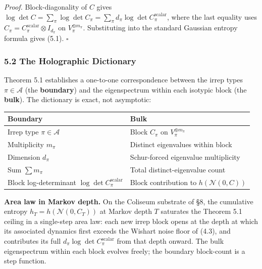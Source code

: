 \documentclass[
  11pt,
]{article}
\newcounter{none} %
\begin{document}
\emph{Proof.} Block-diagonality of \(C\) gives
\(\log\det C = \sum_\pi \log\det C_\pi = \sum_\pi d_\pi \log\det C_\pi^\text{scalar}\),
where the last equality uses
\(C_\pi = C_\pi^\text{scalar} \otimes I_{d_\pi}\) on
\(V_\pi^{\oplus m_\pi}\). Substituting into the standard Gaussian
entropy formula gives (5.1). \(\square\)

\subsubsection{5.2 The Holographic
Dictionary}\label{the-holographic-dictionary}

Theorem 5.1 establishes a one-to-one correspondence between the irrep
types \(\pi \in \mathcal{A}\) (the \textbf{boundary}) and the
eigenspectrum within each isotypic block (the \textbf{bulk}). The
dictionary is exact, not asymptotic:

{\def\LTcaptype{none} %
\begin{longtable}[]{@{}
  >{\raggedright\arraybackslash}p{}
  >{\raggedright\arraybackslash}p{}@{}}
\toprule\noalign{}
\begin{minipage}[b]{\linewidth}\raggedright
Boundary
\end{minipage} & \begin{minipage}[b]{\linewidth}\raggedright
Bulk
\end{minipage} \\
\midrule\noalign{}
\endhead
\bottomrule\noalign{}
\endlastfoot
Irrep type \(\pi \in \mathcal{A}\) & Block \(C_\pi\) on
\(V_\pi^{\oplus m_\pi}\) \\
Multiplicity \(m_\pi\) & Distinct eigenvalues within block \\
Dimension \(d_\pi\) & Schur-forced eigenvalue multiplicity \\
Sum \(\sum m_\pi\) & Total distinct-eigenvalue count \\
Block log-determinant \(\log\det C_\pi^\text{scalar}\) & Block
contribution to \(h(\mathcal{N}(0,C))\) \\
\end{longtable}
}

\textbf{Area law in Markov depth.} On the Coliseum substrate of §8, the
cumulative entropy \(h_T = h(\mathcal{N}(0, C_T))\) at Markov depth
\(T\) saturates the Theorem 5.1 ceiling in a single-step area law: each
new irrep block opens at the depth at which its associated dynamics
first exceeds the Wishart noise floor of (4.3), and contributes its full
\(d_\pi \log\det C_\pi^\text{scalar}\) from that depth onward. The bulk
eigenspectrum within each block evolves freely; the boundary block-count
is a step function.
\end{document}
